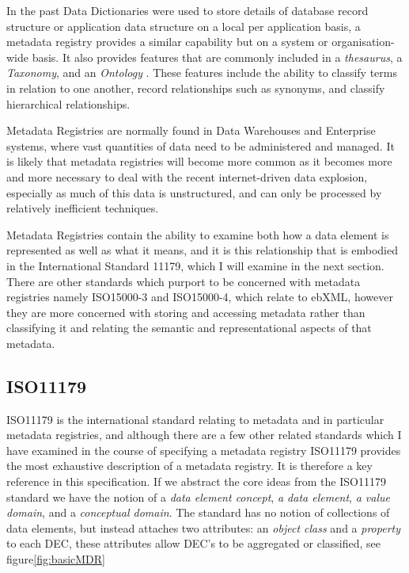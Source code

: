 In the past Data Dictionaries were used to store details of database record structure or application data structure on a local per application basis, a metadata registry provides a similar capability but on a system or organisation-wide basis. It also provides features that are commonly included in a \emph{thesaurus}, a \emph{Taxonomy}, and an \emph{Ontology} . These features include the ability to classify terms in relation to one another, record relationships such as synonyms, and classify hierarchical relationships.

Metadata Registries are normally found in Data Warehouses and Enterprise systems, where vast quantities of data need to be administered and managed. It is likely that metadata registries will become more common as it becomes more and more necessary to deal with the recent internet-driven data explosion, especially as much of this data is unstructured, and can only be processed by relatively inefficient techniques.

Metadata Registries contain the ability to examine both how a data element is represented as well as what it means, and it is this relationship that is embodied in the International Standard 11179, which I will examine in the next section. There are other standards which purport to be concerned with metadata registries namely ISO15000-3 and ISO15000-4, which relate to ebXML, however they are more concerned with storing and accessing metadata rather than classifying it and relating the semantic and representational aspects of that metadata.

\subsection{ISO11179}
ISO11179 is the international standard relating to metadata and in particular metadata registries, and although there are a few other related standards which I have examined in the course of specifying a metadata registry ISO11179 provides the most exhaustive description of a metadata registry. It is therefore a key reference in this specification. If we abstract the core ideas from the ISO11179 standard we have the notion of a \emph{data element concept}, \emph{a data element}, \emph{a value domain}, and a \emph{conceptual domain}. The standard has no notion of collections of data elements, but instead attaches two attributes: an \emph{object class} and a \emph{property} to each DEC, these attributes allow DEC's to be aggregated or classified, see figure\ref{fig:basicMDR}


